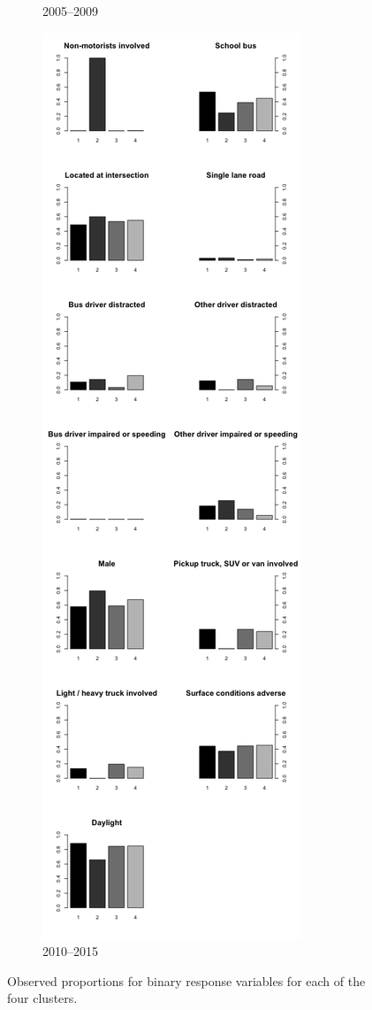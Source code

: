 \begin{figure}[t]
\begin{subfigure}{.5\textwidth}
                \caption{2005--2009}
        \end{subfigure}%
        \begin{subfigure}{.5\textwidth}
                  \includegraphics[width=1\linewidth]{binary_proportions_scaled.png}
                  \caption{2010--2015}
        \end{subfigure}
        \caption{Observed proportions for binary response variables for each of the four clusters.}
 \label{fig:clus2}
\end{figure}

